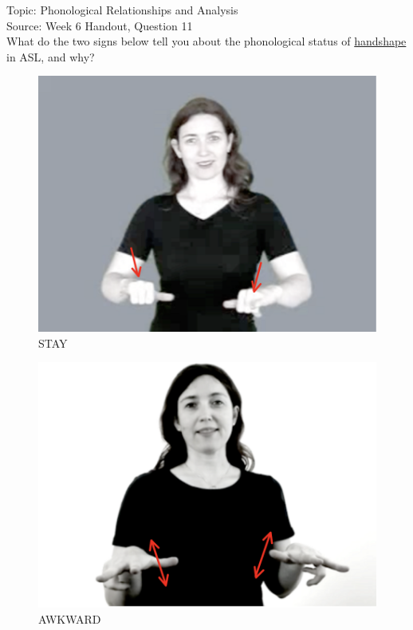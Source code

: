 \documentclass[12pt]{article}
\begin{document}
Topic: Phonological Relationships and Analysis\\
Source: Week 6 Handout, Question 11\\

What do the two signs below tell you about the phonological status of \underline{handshape} in ASL, and why?\\

\begin{figure}[H]
\includegraphics{../images/asl_stay.png}
\caption{STAY}
\end{figure}
\begin{figure}[H]
\includegraphics{../images/asl_awkward.png}
\caption{AWKWARD}
\end{figure}
\end{document}
